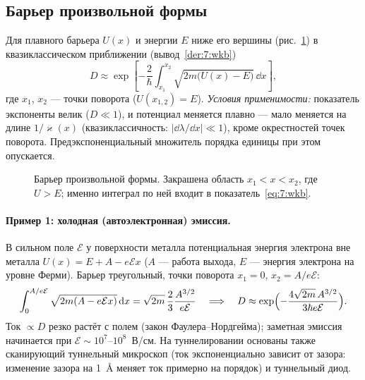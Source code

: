 \subsection{Барьер произвольной формы}

Для плавного барьера $U(x)$ и энергии $E$ ниже его вершины (рис.~\ref{fig:7:wkb}) в
квазиклассическом приближении (вывод~\ref{der:7:wkb})
\begin{equation}\label{eq:7:wkb}
  D\approx\exp\left[-\frac{2}{\hbar}\int_{x_1}^{x_2}\sqrt{2m\bigl(U(x)-E\bigr)}\,\dd x\right],
\end{equation}
где $x_1$, $x_2$ — точки поворота ($U(x_{1,2})=E$). \emph{Условия применимости:} показатель
экспоненты велик ($D\ll1$), и потенциал меняется плавно — мало меняется на длине
$1/\varkappa(x)$ (квазиклассичность: $|\dd\lambda/\dd x|\ll1$), кроме окрестностей точек поворота.
Предэкспоненциальный множитель порядка единицы при этом опускается.

\begin{figure}[htbp]
\centering
{}
\caption{Барьер произвольной формы. Закрашена область $x_1<x<x_2$, где $U>E$; именно
интеграл по ней входит в показатель~\eqref{eq:7:wkb}.}
\label{fig:7:wkb}
\end{figure}

\paragraph{Пример 1: холодная (автоэлектронная) эмиссия.} В сильном поле $\mathcal E$ у
поверхности металла потенциальная энергия электрона вне металла $U(x)=E+A-e\mathcal Ex$ ($A$ —
работа выхода, $E$ — энергия электрона на уровне Ферми). Барьер треугольный, точки поворота
$x_1=0$, $x_2=A/e\mathcal E$:
\[
  \int_0^{A/e\mathcal E}\sqrt{2m(A-e\mathcal Ex)}\,\mathrm{d} x=\sqrt{2m}\,\frac{2}{3}\frac{A^{3/2}}{e\mathcal E}
  \quad\Longrightarrow\quad
  D\approx\exp\Bigl(-\frac{4\sqrt{2m}\,A^{3/2}}{3\hbar e\mathcal E}\Bigr).
\]
Ток $\propto D$ резко растёт с полем (закон Фаулера--Нордгейма); заметная эмиссия начинается при
$\mathcal E\sim10^7$--$10^8$~В/см. На туннелировании основаны также сканирующий туннельный
микроскоп (ток экспоненциально зависит от зазора: изменение зазора на 1~Å меняет ток примерно на
порядок) и туннельный диод.

